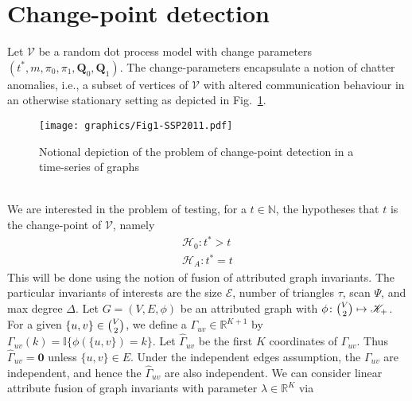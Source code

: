 \documentclass[final]{IEEEtran}
\theoremstyle{definition}
\begin{document}
\section{Change-point detection}
Let $\mathscr{V}$ be a random dot process model with change parameters
$(t^{*}, m, \pi_0, \pi_1, \mathbf{Q}_0, \mathbf{Q}_1)$. The
change-parameters encapsulate a notion of chatter anomalies, i.e., a
subset of vertices of $\mathscr{V}$ with altered communication
behaviour in an otherwise stationary setting as depicted in
Fig.~\ref{fig:notional_change_point}.
\begin{figure}[htbp]
  \centering
  \texttt{[image: graphics/Fig1-SSP2011.pdf]}
  \caption{Notional depiction of the problem of change-point detection
    in a time-series of graphs}
  \label{fig:notional_change_point}
\end{figure}
\\ \noindent
We are interested in
the problem of testing, for a $t \in \mathbb{N}$, the hypotheses that
$t$ is the change-point of $\mathscr{V}$, namely
\begin{gather*}
  \mathscr{H}_0 \colon t^{*} > t \\
  \mathscr{H}_A \colon t^{*} = t
\end{gather*}
This will be done using the notion of fusion of attributed graph
invariants.  The particular invariants of interests are the size
$\mathcal{E}$, number of triangles $\tau$, scan $\Psi$, and
max degree $\Delta$. Let $G = (V,E,\phi)$ be an attributed graph with 
$\phi \colon \tbinom{V}{2} \mapsto \mathscr{K}_{+}$. For a given
$\{u,v\} \in \tbinom{V}{2}$, we define a $\Gamma_{uv} \in
\mathbb{R}^{K+1}$ by $\Gamma_{uv}(k) = \mathbb{I}\{\phi(\{u,v\}) =
k\}$. Let $\widehat{\Gamma}_{uv}$ be the first $K$ coordinates of
$\Gamma_{uv}$. Thus $\widehat{\Gamma}_{uv} = \bm{0}$ unless $\{u,v\}
\in E$. Under the independent edges assumption, the
$\Gamma_{uv}$ are independent, and hence the $\widehat{\Gamma}_{uv}$
are also independent. We can consider linear attribute fusion of graph invariants with
parameter $\lambda \in \mathbb{R}^{K}$ via
\end{document}
